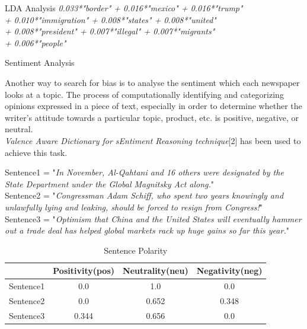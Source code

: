 \documentclass[final]{beamer}
\newlength{\onecolwid}
\begin{document}
\begin{frame}[t]
\begin{columns}[t]
\begin{column}{\onecolwid}
\begin{block}{LDA Analysis}
     \textit{0.033*"border" + 0.016*"mexico" + 0.016*"trump" \\
    + 0.010*"immigration" + 0.008*"states" + 0.008*"united" \\
    + 0.008*"president" + 0.007*"illegal" + 0.007*"migrants" \\
    + 0.006*"people"}


       \end{block}

    \begin{block}{Sentiment Analysis}

        Another way to search for bias is to analyse the sentiment which each newspaper looks at a topic.
        The process of computationally identifying and categorizing opinions expressed in a piece of text, especially in order to determine whether the writer's attitude towards a particular topic, product, etc. is positive, negative, or neutral. \\
        \textit{Valence Aware Dictionary for sEntiment Reasoning technique}[2] has been used to achieve this task.

        \vspace{10mm}

        Sentence1 = "\textit{In November, Al-Qahtani and 16 others were designated by the State Department under the Global Magnitsky Act along.}" \\
        Sentence2 = "\textit{Congressman Adam Schiff, who spent two years knowingly and unlawfully lying and leaking, should be forced to resign from Congress!}" \\
        Sentence3 = "\textit{Optimism that China and the United States will eventually hammer out a trade deal has helped global markets rack up huge gains so far this year.}" \\
        \vspace{10mm}

        \begin{table}    
            \begin{tabular}{l c c c}
            \hline
              & Positivity(pos) & Neutrality(neu) & Negativity(neg)  \\ [0.5ex]
            \hline\hline
            Sentence1 & 0.0 & 1.0 & 0.0 \\
            Sentence2 & 0.0 & 0.652 & 0.348 \\
            Sentence3  & 0.344 & 0.656 & 0.0 \\
            \end{tabular}
            \caption{Sentence Polarity}
        \end{table}
        

\end{block}
\end{column}
\end{columns}
\end{frame}
\end{document}
